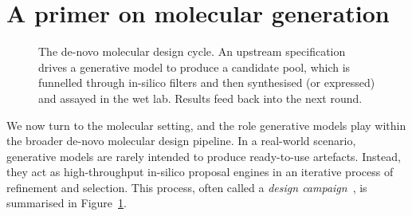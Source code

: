 \documentclass[12pt,a4paper,twoside]{report}
\begin{document}
\section{A primer on molecular generation}
\label{sec:primer}

\begin{figure}[!ht]
\centering
{}
\caption{The de-novo molecular design cycle. An upstream specification drives a generative model to produce a candidate pool, which is funnelled through in-silico filters and then synthesised (or expressed) and assayed in the wet lab. Results feed back into the next round.}
\label{fig:design-cycle}
\end{figure}

We now turn to the molecular setting, and the role generative models play within the broader de-novo molecular design pipeline. In a real-world scenario, generative models are rarely intended to produce ready-to-use artefacts. Instead, they act as high-throughput in-silico proposal engines in an iterative process of refinement and selection. This process, often called a \emph{design campaign}~\cite{Schneider2018}, is summarised in Figure~\ref{fig:design-cycle}.
\end{document}
